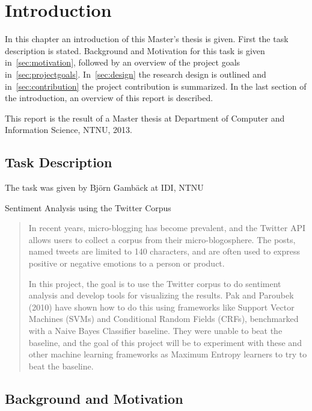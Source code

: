 \chapter{Introduction}

In this chapter an introduction of this Master's thesis is given. First the task description is stated. Background and Motivation for this task is given in~\autoref{sec:motivation}, followed by an overview of the project goals in~\autoref{sec:projectgoals}. In~\autoref{sec:design} the research design is outlined and in~\autoref{sec:contribution} the project contribution is summarized. In the last section of the introduction, an overview of this report is described. 

This report is the result of a Master thesis at Department of Computer and Information Science, NTNU, 2013. 

\section{Task Description}
\label{sec:task}

The task was given by Bj\"{o}rn Gamb\"{a}ck at IDI, NTNU

\begin{center} \Large Sentiment Analysis using the Twitter Corpus \end{center}
\begin{quotation}
In recent years, micro-blogging has become prevalent, and the Twitter API allows users to collect a corpus from their micro-blogosphere. The posts, named tweets are limited to 140 characters, and are often used to express positive or negative emotions to a person or product.

In this project, the goal is to use the Twitter corpus to do sentiment analysis and develop tools for visualizing the results. Pak and Paroubek (2010) have shown how to do this using frameworks like Support Vector Machines (SVMs) and Conditional Random Fields (CRFs), benchmarked with a Naive Bayes Classifier baseline. They were unable to beat the baseline, and the goal of this project will be to experiment with these and other machine learning frameworks as Maximum Entropy learners to try to beat the baseline.
\end{quotation}


\section{Background and Motivation}
\label{sec:motivation}


